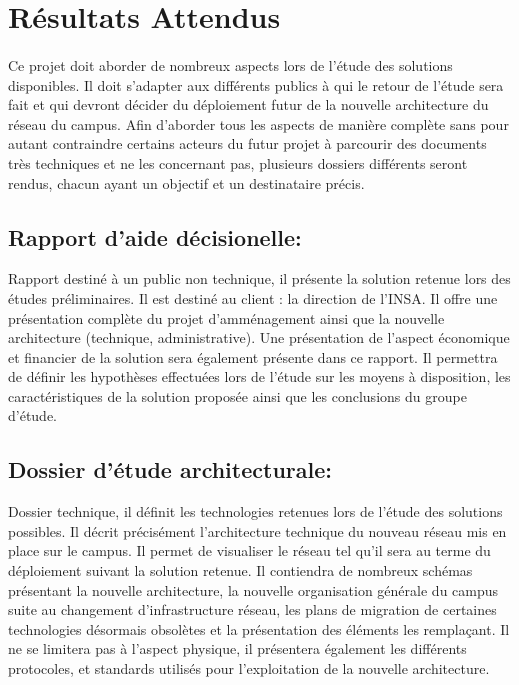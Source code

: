 \section{Résultats Attendus}
\paragraph{} Ce projet doit aborder de nombreux aspects lors de l'étude des solutions disponibles. Il doit s'adapter aux différents publics à qui le retour de l'étude sera fait et qui devront décider du déploiement futur de la nouvelle architecture du réseau du campus. Afin d'aborder tous les aspects de manière complète sans pour autant contraindre certains acteurs du futur projet à parcourir des documents très techniques et ne les concernant pas, plusieurs dossiers différents seront rendus, chacun ayant un objectif et un destinataire précis. \\


\subsection{Rapport d'aide décisionelle:} Rapport destiné à un public non technique, il présente la solution retenue lors  des études préliminaires. Il est destiné au client : la direction de l'INSA. Il offre une présentation complète du projet d'amménagement ainsi que la nouvelle architecture (technique, administrative). Une présentation de l'aspect économique et financier de la solution sera également présente dans ce rapport. Il permettra de définir les hypothèses effectuées lors de l'étude sur les moyens à disposition, les caractéristiques de la solution proposée ainsi que les conclusions du groupe d'étude.

\subsection{Dossier d'étude architecturale:} Dossier technique, il définit les technologies retenues lors de l'étude des solutions possibles. Il décrit précisément l'architecture technique du nouveau réseau mis en place sur le campus. Il permet de visualiser le réseau tel qu'il sera au terme du déploiement suivant la solution retenue. Il contiendra de nombreux schémas présentant la nouvelle architecture, la nouvelle organisation générale du campus suite au changement d'infrastructure réseau, les plans de migration de certaines technologies désormais obsolètes et la présentation des éléments les remplaçant. Il ne se limitera pas à l'aspect physique, il présentera également les différents protocoles, et standards utilisés pour l'exploitation de la nouvelle architecture.

